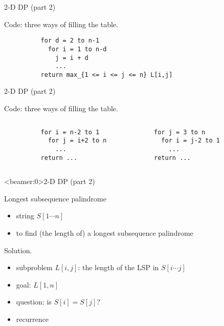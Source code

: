 \begin{frame}[fragile]{2-D DP (part 2)}
  \begin{block}{Code: three ways of filling the table.}

    \begin{center}
        \begin{verbatim}
          for d = 2 to n-1
            for i = 1 to n-d
              j = i + d
              ...
          return max_{1 <= i <= j <= n} L[i,j]
       \end{verbatim}
    \end{center}
  \end{block}
\end{frame}
\begin{frame}[fragile]{2-D DP (part 2)}
  \begin{block}{Code: three ways of filling the table.}
    \begin{columns}[t]
        \begin{verbatim}
          for i = n-2 to 1
            for j = i+2 to n
              ...
          return ...
        \end{verbatim}
        \begin{verbatim}
          for j = 3 to n
            for i = j-2 to 1
              ...
          return ...
       \end{verbatim}
    \end{columns}
  \end{block}
\end{frame}
\begin{frame}<beamer:0>{2-D DP (part 2)}
  \begin{exampleblock}{Longest subsequence palindrome }
    \begin{itemize}
      \item string $S[1 \cdots n]$
      \item to find (the length of) a longest subsequence palindrome
    \end{itemize}
  \end{exampleblock}

  \pause
  \begin{block}{Solution.}
    \begin{itemize}
      \item subproblem $L[i,j]$: the length of the LSP in $S[i \cdots j]$
      \item goal: $L[1,n]$
      \item question: is $S[i] = S[j]$?
      \item recurrence
    \end{itemize}
  \end{block}
\end{frame}
